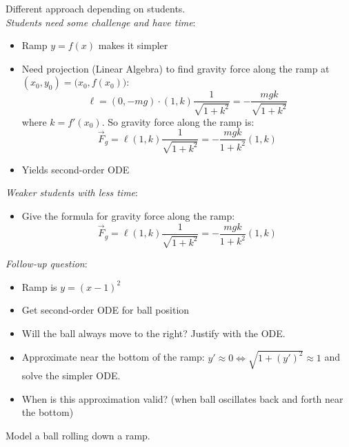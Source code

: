 \begin{annotation}
	\begin{goals}
		Different approach depending on students. \\
		
		\emph{Students need some challenge and have time}:
		\begin{itemize}
			\item Ramp $y=f(x)$ makes it simpler
			\item Need projection (Linear Algebra) to find gravity force along the ramp at $(x_0,y_0) = \big(x_0,f(x_0)\big)$:
			$$			
			\ell = (0,-mg) \cdot (1, k)\frac{1}{\sqrt{1+k^2}} = -\frac{mgk}{\sqrt{1+k^2}}
			$$
			where $k = f'(x_0)$.
			So gravity force along the ramp is:
			$$
			\vec{F}_g = \ell (1, k)\frac{1}{\sqrt{1+k^2}} = -\frac{mgk}{1+k^2} (1,k)
			$$
			\item Yields second-order ODE 
		\end{itemize}
		\hfil
		
		\emph{Weaker students with less time}:
		\begin{itemize}
			\item Give the formula for gravity force along the ramp:
			$$
			\vec{F}_g = \ell (1, k)\frac{1}{\sqrt{1+k^2}} = -\frac{mgk}{1+k^2} (1,k)
			$$
		\end{itemize}
		
		\hfil
		
		\emph{Follow-up question}:
		\begin{itemize}
			\item Ramp is $y=(x-1)^2$
			\item Get second-order ODE for ball position
			\item Will the ball always move to the right? Justify with the ODE.
			\item Approximate near the bottom of the ramp: $y' \approx 0 \Leftrightarrow \sqrt{1+(y')^2} \approx 1$ and solve the simpler ODE.
			\item When is this approximation valid? (when ball oscillates back and forth near the bottom)
		\end{itemize}
	\end{goals}
\end{annotation}
\question \label{2nd:ballrolling}
	Model a ball rolling down a ramp.

	



\standardonlynewpage

%
%



